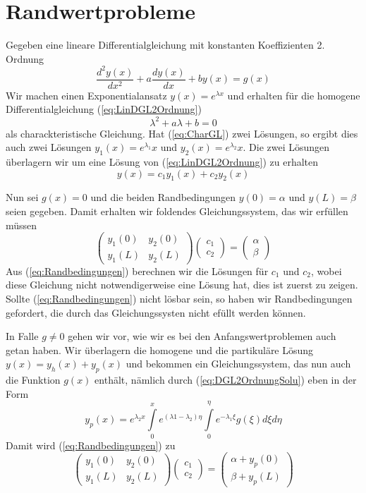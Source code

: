 \section{Randwertprobleme}
Gegeben eine lineare Differentialgleichung mit konstanten Koeffizienten 2. Ordnung
\begin{equation}
    \frac{d^2y(x)}{dx^2}+a\frac{dy(x)}{dx}+by(x)=g(x)
    \label{eq:LinDGL2Ordnung}
\end{equation}
Wir machen einen Exponentialansatz $y(x)=e^{\lambda x}$ und erhalten für die homogene Differentialgleichung (\ref{eq:LinDGL2Ordnung})
\begin{equation}
    \lambda^2+a\lambda+b=0
    \label{eq:CharGL}
\end{equation}
als charackteristische Gleichung. Hat (\ref{eq:CharGL}) zwei Lösungen, so ergibt dies auch zwei Lösungen $y_1(x)=e^{\lambda_1} x$ und $y_2(x)=e^{\lambda_2}x$. Die zwei Lösungen überlagern wir um eine Lösung von (\ref{eq:LinDGL2Ordnung}) zu erhalten
\[ y(x)=c_1 y_1(x)+c_2 y_2(x) \]

Nun sei $g(x)=0$ und die beiden Randbedingungen $y(0)=\alpha$ und $y(L)=\beta$ seien gegeben. Damit erhalten wir foldendes Gleichungssystem, das wir erfüllen müssen
\begin{equation}
    \begin{pmatrix}y_1(0)&y_2(0)\\ y_1(L)&y_2(L)\end{pmatrix}
    \begin{pmatrix}c_1\\ c_2\end{pmatrix} = 
     \begin{pmatrix}\alpha \\ \beta\end{pmatrix}
\label{eq:Randbedingungen}
\end{equation}
Aus (\ref{eq:Randbedingungen}) berechnen wir die Lösungen für $c_1$ und $c_2$, wobei diese Gleichung nicht notwendigerweise eine Lösung hat, dies ist zuerst zu zeigen. Sollte (\ref{eq:Randbedingungen}) nicht lösbar sein, so haben wir Randbedingungen gefordert, die durch das Gleichungssysten nicht efüllt werden können.

In Falle $g\ne 0$ gehen wir vor, wie wir es bei den Anfangswertproblemen auch getan haben. Wir überlagern die homogene und die partikuläre Lösung $y(x)=y_h(x)+y_p(x)$ und bekommen ein Gleichungssystem, das nun auch die Funktion $g(x)$ enthält, nämlich durch (\ref{eq:DGL2OrdnungSolu}) eben in der Form
\[ y_p(x)=e^{\lambda_2 x}\int\limits_0^x e^{(\lambda1-\lambda_2)\eta}\int\limits_0^{\eta}e^{-\lambda_1 \xi}g(\xi)d\xi d\eta\]
Damit wird (\ref{eq:Randbedingungen}) zu
\begin{equation}
    \begin{pmatrix}y_1(0)&y_2(0)\\ y_1(L)&y_2(L)\end{pmatrix}
    \begin{pmatrix}c_1\\ c_2\end{pmatrix} = 
     \begin{pmatrix}\alpha+y_p(0) \\ \beta+y_p(L)\end{pmatrix}
\label{eq:RandBDInhom}
\end{equation}